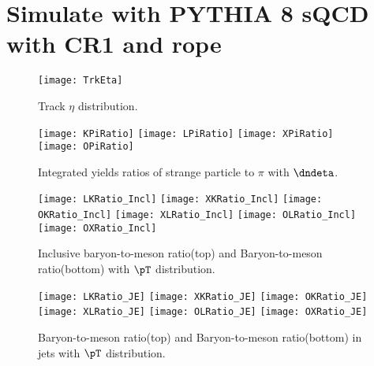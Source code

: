
\section{Simulate with PYTHIA 8 sQCD with CR1 and rope}%
\label{sec:CRorRope}
\begin{figure}[ht]
        \begin{center}
                \texttt{[image: TrkEta]}
        \end{center}
        \caption{Track $\eta$ distribution.}
        \label{fig:TrkEta}
\end{figure}


\begin{figure}[ht]
	\begin{center}
		\texttt{[image: KPiRatio]}
		\texttt{[image: LPiRatio]}
		\texttt{[image: XPiRatio]}
		\texttt{[image: OPiRatio]}
	\end{center}
	\caption{Integrated yields ratios of strange particle to $\pi$ with $\dndeta$.}
	\label{fig:IntegralPartoPiRatio}
\end{figure}


\begin{figure}[ht]
        \begin{center}
                \texttt{[image: LKRatio\_Incl]}
                \texttt{[image: XKRatio\_Incl]}
                \texttt{[image: OKRatio\_Incl]}
                \texttt{[image: XLRatio\_Incl]}
                \texttt{[image: OLRatio\_Incl]}
                \texttt{[image: OXRatio\_Incl]}
        \end{center}
	\caption{Inclusive baryon-to-meson ratio(top) and Baryon-to-meson ratio(bottom) with $\pT$ distribution.}
        \label{fig:InclParRatio}
\end{figure}

\begin{figure}[ht]
        \begin{center}
                \texttt{[image: LKRatio\_JE]}
                \texttt{[image: XKRatio\_JE]}
                \texttt{[image: OKRatio\_JE]}
                \texttt{[image: XLRatio\_JE]}
                \texttt{[image: OLRatio\_JE]}
                \texttt{[image: OXRatio\_JE]}
        \end{center}
        \caption{Baryon-to-meson ratio(top) and Baryon-to-meson ratio(bottom) in jets with $\pT$ distribution.}
        \label{fig:JEParRatio}
\end{figure}

